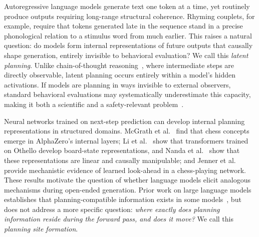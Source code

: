 \documentclass{article}
\begin{document}
Autoregressive language models generate text one token at a time, yet routinely produce outputs requiring long-range structural coherence. Rhyming couplets, for example, require that tokens generated late in the sequence stand in a precise phonological relation to a stimulus word from much earlier. This raises a natural question: do models form internal representations of future outputs that causally shape generation, entirely invisible to behavioral evaluation? We call this \textit{latent planning}. Unlike chain-of-thought reasoning~\citep{wei2022chain}, where intermediate steps are directly observable, latent planning occurs entirely within a model's hidden activations. If models are planning in ways invisible to external observers, standard behavioral evaluations may systematically underestimate this capacity, making it both a scientific and a safety-relevant problem~\citep{pfau2024dots,hao2024coconut}.

Neural networks trained on next-step prediction can develop internal planning representations in structured domains. McGrath et al.~\citeyearpar{mcgrath22} find that chess concepts emerge in AlphaZero's internal layers; Li et al.~\citeyearpar{li24} show that transformers trained on Othello develop board-state representations, and Nanda et al.~\citeyearpar{nanda23} show that these representations are linear and causally manipulable; and Jenner et al.~\citeyearpar{jenner24} provide mechanistic evidence of learned look-ahead in a chess-playing network. These results motivate the question of whether language models elicit analogous mechanisms during open-ended generation. Prior work on large language models establishes that planning-compatible information exists in some models~\citep{maar2026whatsplanmetricsimplicit,hanna2026latent,dong2025emergentresponseplanningllms,pochinkov2025parascopeslanguagemodelsactivations}, but does not address a more specific question: \textit{where exactly does planning information reside during the forward pass, and does it move?} We call this \textit{planning site formation}.
\end{document}
